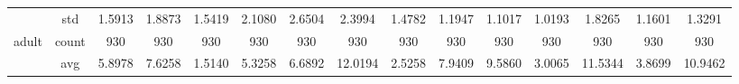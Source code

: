 \begin{table}[H]
{\begin{tabular}{rcccc|c|c|c|c|c|ccccc}
			                                                                               & std                                    & 1.5913                                                                             & 1.8873                                                                    & 1.5419                                                                    & 2.1080                                         & 2.6504                                                                    & 2.3994                                       & 1.4782                                      & 1.1947                                         & 1.1017                                         & 1.0193                                          & 1.8265                                          & 1.1601                                         & 1.3291                                         \\
			adult                                                                          & count                                  & 930                                                                                & 930                                                                       & 930                                                                       & 930                                            & 930                                                                       & 930                                          & 930                                         & 930                                            & 930                                            & 930                                             & 930                                             & 930                                            & 930                                            \\
			                                                                               & avg                                    & 5.8978                                                                             & 7.6258                                                                    & \cellcolor[rgb]{ .776,  .937,  .808}\textcolor[rgb]{ 0,  .38,  0}{1.5140} & 5.3258                                         & 6.6892                                                                    & 12.0194                                      & 2.5258                                      & 7.9409                                         & 9.5860                                         & 3.0065                                          & 11.5344                                         & 3.8699                                         & 10.9462                                        \\

\end{tabular}}
\end{table}
